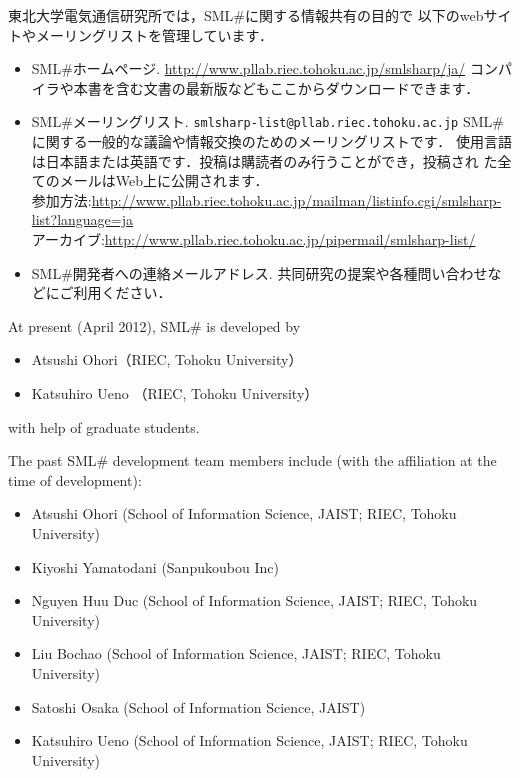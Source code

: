 \documentclass{jbook}
\newcommand{\smlsharp}{SML\#}
\begin{document}
	東北大学電気通信研究所では，\smlsharp{}に関する情報共有の目的で
以下のwebサイトやメーリングリストを管理しています．
\begin{itemize}
\item \smlsharp{}ホームページ.
\url{http://www.pllab.riec.tohoku.ac.jp/smlsharp/ja/}
コンパイラや本書を含む文書の最新版などもここからダウンロードできます．

\item \smlsharp{}メーリングリスト.
{\tt smlsharp-list@pllab.riec.tohoku.ac.jp}
\smlsharp{}に関する一般的な議論や情報交換のためのメーリングリストです．
使用言語は日本語または英語です．投稿は購読者のみ行うことができ，投稿され
た全てのメールはWeb上に公開されます．\\
参加方法:\url{http://www.pllab.riec.tohoku.ac.jp/mailman/listinfo.cgi/smlsharp-list?language=ja}\\
アーカイブ:\url{http://www.pllab.riec.tohoku.ac.jp/pipermail/smlsharp-list/}

\item \smlsharp{}開発者への連絡メールアドレス.
共同研究の提案や各種問い合わせなどにご利用ください．
\end{itemize}
\else%
	At present (April 2012), \smlsharp{} is developed by
\begin{itemize}
\item 
Atsushi Ohori（RIEC, Tohoku University）
\item 
Katsuhiro Ueno （RIEC, Tohoku University）
\end{itemize}
with help of graduate students.

	The past \smlsharp{} development team members include (with the
affiliation at the time of development):
\begin{itemize}
\item Atsushi Ohori (School of Information Science, JAIST; RIEC, Tohoku University)
\item Kiyoshi Yamatodani (Sanpukoubou Inc)
\item Nguyen Huu Duc (School of Information Science, JAIST; RIEC, Tohoku University)
\item Liu Bochao (School of Information Science, JAIST; RIEC, Tohoku University)
\item Satoshi Osaka (School of Information Science, JAIST)
\item Katsuhiro Ueno (School of Information Science, JAIST; RIEC, Tohoku University)
\end{itemize}
\end{document}
